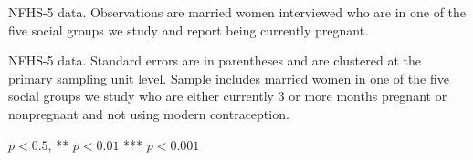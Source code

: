 \documentclass[12pt]{article}
\begin{document}
\begin{table}[H]
    \centering

    \begin{threeparttable}
            
    \caption{: Distribution of gestational ages suggests under-reporting of early pregnancy}
    \label{gestdur_distribution}
    \small
    \setlength{\tabcolsep}{5pt}
    
        
    
    \small
    \begin{tablenotes}
        \item  
    \end{tablenotes}

    \begin{tablenotes}
    \footnotesize
    \item 
        NFHS-5 data. Observations are married women interviewed who are in one of the five social groups we study and report being currently pregnant.
    \end{tablenotes}
    
    \end{threeparttable}
\end{table}

\newpage

\newpage
\begin{table}[!htbp]
    \centering
    \begin{threeparttable}
        \caption{: Variables used in the nonparametric reweighting predict pregnancy}
        \label{tab:regression}

        \scriptsize
        \setlength{\tabcolsep}{1pt}
        \renewcommand{\arraystretch}{0.81}

        {}

        \begin{tablenotes}
            \item NFHS-5 data. Standard errors are in parentheses and are clustered at the primary sampling unit level. Sample includes married women in one of the five social groups we study who are either currently 3 or more months pregnant or nonpregnant and not using modern contraception.
            \item * $p<0.5$, ** $p<0.01$ *** $p<0.001$ 
        \end{tablenotes}
    \end{threeparttable}
\end{table}
\end{document}
